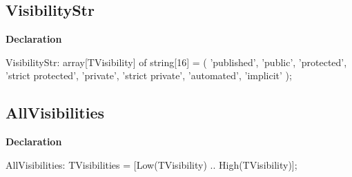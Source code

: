 \documentclass{report}
\newif\ifpdf
\begin{document}
\subsection*{VisibilityStr}
\fi
\label{PasDoc_Items-VisibilityStr}
\begin{list}{}{
\setlength{\itemindent}{0cm}
\setlength{\listparindent}{0cm}
\setlength{\leftmargin}{\evensidemargin}
\addtolength{\leftmargin}{\tmplength}
\settowidth{\labelsep}{X}
\addtolength{\leftmargin}{\labelsep}
\setlength{\labelwidth}{\tmplength}
}
\item[\textbf{Declaration}\hfill]
\ifpdf
\begin{flushleft}
\fi
\begin{ttfamily}
VisibilityStr: array[TVisibility] of string[16] =
  (
   'published',
   'public',
   'protected',
   'strict protected',
   'private',
   'strict private',
   'automated',
   'implicit'
  );\end{ttfamily}

\ifpdf
\end{flushleft}
\fi

\end{list}
\ifpdf
\subsection*{\large{\textbf{AllVisibilities}}\normalsize\hspace{1ex}\hrulefill}
\else
\subsection*{AllVisibilities}
\fi
\label{PasDoc_Items-AllVisibilities}
\begin{list}{}{
\setlength{\itemindent}{0cm}
\setlength{\listparindent}{0cm}
\setlength{\leftmargin}{\evensidemargin}
\addtolength{\leftmargin}{\tmplength}
\settowidth{\labelsep}{X}
\addtolength{\leftmargin}{\labelsep}
\setlength{\labelwidth}{\tmplength}
}
\item[\textbf{Declaration}\hfill]
\ifpdf
\begin{flushleft}
\fi
\begin{ttfamily}
AllVisibilities: TVisibilities = [Low(TVisibility) .. High(TVisibility)];\end{ttfamily}

\ifpdf
\end{flushleft}
\fi

\end{list}
\ifpdf
\end{document}
